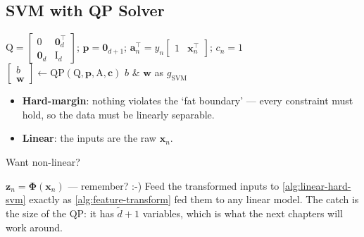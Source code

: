 \subsection{SVM with QP Solver}

\begin{algorithm}[H]
    \caption{Linear Hard-Margin SVM}\label{alg:linear-hard-svm}
    \(\mathrm{Q} = \begin{bmatrix} 0 & \bm{0}_d^\top \\ \bm{0}_d &
        \mathrm{I}_d \end{bmatrix}\); \(\bm{p} = \bm{0}_{d+1}\);
        \(\bm{a}_n^\top = y_n \begin{bmatrix} 1 & \bm{x}_n^\top
        \end{bmatrix}\); \(c_n = 1\)\;
    \(\begin{bmatrix} b \\ \bm{w} \end{bmatrix} \gets
        \mathrm{QP}(\mathrm{Q}, \bm{p}, \mathrm{A}, \bm{c})\)\;
    \Return \(b\) \& \(\bm{w}\) as \(g_{\mathrm{SVM}}\)\;
\end{algorithm}

\begin{itemize}
    \item \textbf{Hard-margin}: nothing violates the `fat boundary' --- every
        constraint must hold, so the data must be linearly separable.
    \item \textbf{Linear}: the inputs are the raw \(\bm{x}_n\).
\end{itemize}

\begin{question}
    Want non-linear?
\end{question}

\(\bm{z}_n = \bm{\Phi}(\bm{x}_n)\) --- remember? :-) Feed the transformed
inputs to \autoref{alg:linear-hard-svm} exactly as
\autoref{alg:feature-transform} fed them to any linear model. The catch is
the size of the QP: it has \(\tilde{d} + 1\) variables, which is what the
next chapters will work around.


